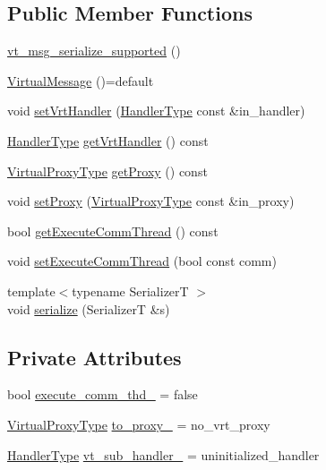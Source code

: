 \subsection*{Public Member Functions}
\begin{DoxyCompactItemize}
\item 
\hyperlink{structvt_1_1vrt_1_1_virtual_message_a4d91471760fc7b86e84a91f54596b1bd}{vt\+\_\+msg\+\_\+serialize\+\_\+supported} ()
\item 
\hyperlink{structvt_1_1vrt_1_1_virtual_message_a28ae0fd29c23d4e9552e659ff7f66cd5}{Virtual\+Message} ()=default
\item 
void \hyperlink{structvt_1_1vrt_1_1_virtual_message_aea0a3a35d2517ef094c9467b0c4ff066}{set\+Vrt\+Handler} (\hyperlink{namespacevt_af64846b57dfcaf104da3ef6967917573}{Handler\+Type} const \&in\+\_\+handler)
\item 
\hyperlink{namespacevt_af64846b57dfcaf104da3ef6967917573}{Handler\+Type} \hyperlink{structvt_1_1vrt_1_1_virtual_message_aaa41fe4b317b868fdcceb7c119feec9c}{get\+Vrt\+Handler} () const
\item 
\hyperlink{namespacevt_a1b417dd5d684f045bb58a0ede70045ac}{Virtual\+Proxy\+Type} \hyperlink{structvt_1_1vrt_1_1_virtual_message_a37cbc50547e033f049af3c9d289036cc}{get\+Proxy} () const
\item 
void \hyperlink{structvt_1_1vrt_1_1_virtual_message_aa4b2b70c7d560be3adff74102803ff51}{set\+Proxy} (\hyperlink{namespacevt_a1b417dd5d684f045bb58a0ede70045ac}{Virtual\+Proxy\+Type} const \&in\+\_\+proxy)
\item 
bool \hyperlink{structvt_1_1vrt_1_1_virtual_message_a9511339ccb737b655708c9071965dc76}{get\+Execute\+Comm\+Thread} () const
\item 
void \hyperlink{structvt_1_1vrt_1_1_virtual_message_a8149137c049179f315d295b5127b61ad}{set\+Execute\+Comm\+Thread} (bool const comm)
\item 
{\footnotesize template$<$typename SerializerT $>$ }\\void \hyperlink{structvt_1_1vrt_1_1_virtual_message_a08c925ee68dfb197b5e1dc9ca961b0d7}{serialize} (SerializerT \&s)
\end{DoxyCompactItemize}
\subsection*{Private Attributes}
\begin{DoxyCompactItemize}
\item 
bool \hyperlink{structvt_1_1vrt_1_1_virtual_message_aed6af00314e6e8e26f6e5ae4d8498f57}{execute\+\_\+comm\+\_\+thd\+\_\+} = false
\item 
\hyperlink{namespacevt_a1b417dd5d684f045bb58a0ede70045ac}{Virtual\+Proxy\+Type} \hyperlink{structvt_1_1vrt_1_1_virtual_message_a4a5e7604c7191fc8d94dac4a973aad8c}{to\+\_\+proxy\+\_\+} = no\+\_\+vrt\+\_\+proxy
\item 
\hyperlink{namespacevt_af64846b57dfcaf104da3ef6967917573}{Handler\+Type} \hyperlink{structvt_1_1vrt_1_1_virtual_message_a9fe6bc641b3cd85c47faaf2cc6883d2a}{vt\+\_\+sub\+\_\+handler\+\_\+} = uninitialized\+\_\+handler
\end{DoxyCompactItemize}


